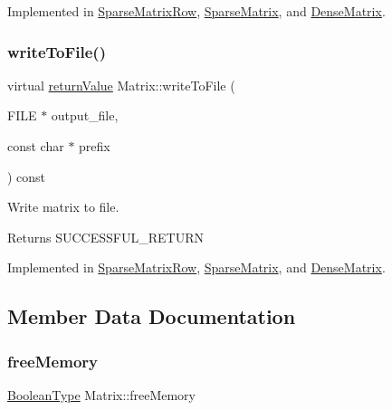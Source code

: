 Implemented in \hyperlink{class_sparse_matrix_row_ab06b8d77a5dc1368ebab56a80d782d60}{Sparse\+Matrix\+Row}, \hyperlink{class_sparse_matrix_a320958bdcdbcbc8fd519e099937a7be9}{Sparse\+Matrix}, and \hyperlink{class_dense_matrix_a2087b67a4239957054ba7a438d0c0d38}{Dense\+Matrix}.

\mbox{\label{class_matrix_a1504bb1a207b6e5d3320289e4af84400}} 
\subsubsection{\texorpdfstring{write\+To\+File()}{writeToFile()}}
{\footnotesize\ttfamily virtual \hyperlink{_message_handling_8hpp_a81d556f613bfbabd0b1f9488c0fa865e}{return\+Value} Matrix\+::write\+To\+File (\begin{DoxyParamCaption}\item[{F\+I\+LE $\ast$}]{output\+\_\+file,  }\item[{const char $\ast$}]{prefix }\end{DoxyParamCaption}) const\hspace{0.3cm}{\ttfamily [pure virtual]}}

Write matrix to file. \begin{DoxyReturn}{Returns}
S\+U\+C\+C\+E\+S\+S\+F\+U\+L\+\_\+\+R\+E\+T\+U\+RN 
\end{DoxyReturn}


Implemented in \hyperlink{class_sparse_matrix_row_ab9f4e7e9bbbc8ddd52d55c97a4dad3ff}{Sparse\+Matrix\+Row}, \hyperlink{class_sparse_matrix_a90325a9e3d620f8f8b8201a7111d2aae}{Sparse\+Matrix}, and \hyperlink{class_dense_matrix_a7f2d13f52bfac45dcf25a1db64569317}{Dense\+Matrix}.



\subsection{Member Data Documentation}
\mbox{\label{class_matrix_a4589bd2bde0875fe3ac82f1f97684c67}} 
\subsubsection{\texorpdfstring{free\+Memory}{freeMemory}}
{\footnotesize\ttfamily \hyperlink{_types_8hpp_a20f82124c82b6f5686a7fce454ef9089}{Boolean\+Type} Matrix\+::free\+Memory\hspace{0.3cm}{\ttfamily [protected]}}

